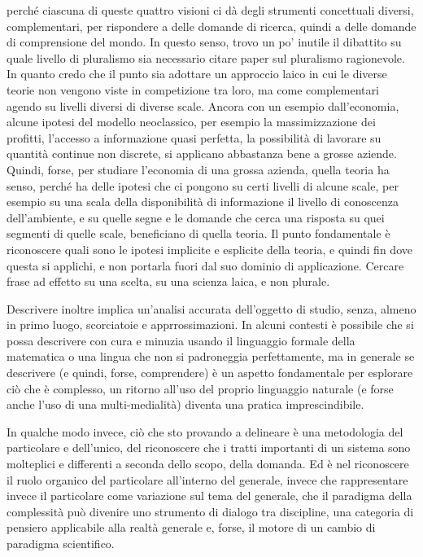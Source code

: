\documentclass[a4paper, headings=standardclasses]{scrartcl}
\begin{document}
perché ciascuna di queste quattro visioni ci dà degli strumenti concettuali diversi, complementari,
per rispondere a delle domande di ricerca, quindi a delle domande di comprensione del mondo.
In questo senso, trovo un po' inutile il dibattito su quale livello di pluralismo sia necessario
citare paper sul pluralismo ragionevole.
In quanto credo che il punto sia adottare un approccio laico in cui le diverse teorie non vengono
viste in competizione tra loro, ma come complementari agendo su livelli diversi di diverse scale.
Ancora con un esempio dall'economia, alcune ipotesi del modello neoclassico,
per esempio la massimizzazione dei profitti, l'accesso a informazione quasi perfetta,
la possibilità di lavorare su quantità continue non discrete, si applicano abbastanza bene a grosse aziende.
Quindi, forse, per studiare l'economia di una grossa azienda, quella teoria ha senso,
perché ha delle ipotesi che ci pongono su certi livelli di alcune scale,
per esempio su una scala della disponibilità di informazione il livello di conoscenza dell'ambiente,
e su quelle segne e le domande che cerca una risposta su quei segmenti di quelle scale,
beneficiano di quella teoria.
Il punto fondamentale è riconoscere quali sono le ipotesi implicite e esplicite della teoria,
e quindi fin dove questa si applichi, e non portarla fuori dal suo dominio di applicazione.
Cercare frase ad effetto su una scelta, su una scienza laica, e non plurale.

Descrivere inoltre implica un'analisi accurata dell'oggetto di studio, senza, almeno in primo luogo, scorciatoie e apprrossimazioni. In alcuni contesti è possibile che si possa descrivere con cura e minuzia usando il linguaggio formale della matematica o una lingua che non si padroneggia perfettamente, ma in generale se descrivere (e quindi, forse, comprendere) è un aspetto fondamentale per esplorare ciò che è complesso, un ritorno all'uso del proprio linguaggio naturale (e forse anche l'uso di una multi-medialità) diventa una pratica imprescindibile.

In qualche modo invece, ciò che sto provando a delineare è una metodologia del particolare e dell'unico, del riconoscere che i tratti importanti di un sistema sono molteplici e differenti a seconda dello scopo, della domanda. Ed è nel riconoscere il ruolo organico del particolare all'interno del generale, invece che rappresentare invece il particolare come variazione sul tema del generale, che il paradigma della complessità può divenire uno strumento di dialogo tra discipline, una categoria di pensiero applicabile alla realtà generale e, forse, il motore di un cambio di paradigma scientifico.
\end{document}
